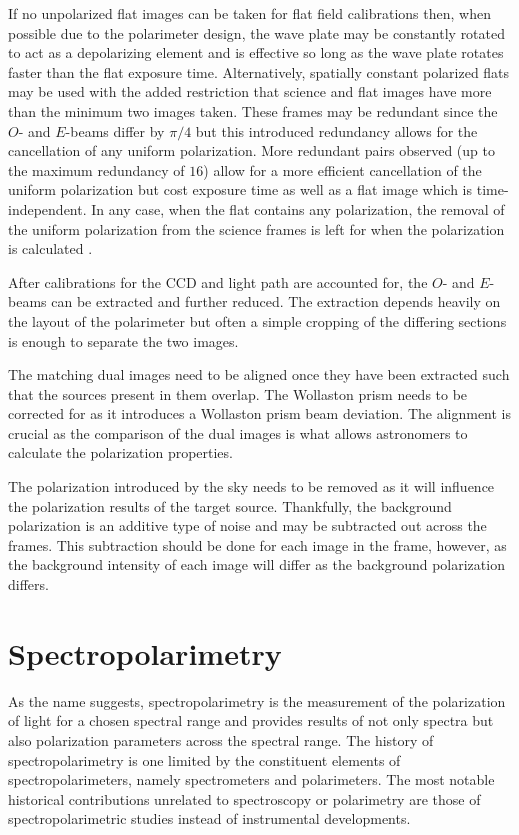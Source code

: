 If no unpolarized flat images can be taken for flat field calibrations then, when possible due to the polarimeter design, the wave plate may be constantly rotated to act as a depolarizing element and is effective so long as the wave plate rotates faster than the flat exposure time. Alternatively, spatially constant polarized flats may be used with the added restriction that science and flat images have more than the minimum two images taken. These frames may be redundant since the $O$- and $E$-beams differ by $\pi / 4$ but this introduced redundancy allows for the cancellation of any uniform polarization. More redundant pairs observed (up to the maximum redundancy of $16$) allow for a more efficient cancellation of the uniform polarization but cost exposure time as well as a flat image which is time-independent. In any case, when the flat contains any polarization, the removal of the uniform polarization  from the science frames is left for when the polarization is calculated \citep{polarimetry_error}.
\prgph

After calibrations for the \gls{CCD} and light path are accounted for, the $O$- and $E$-beams can be extracted and further reduced. The extraction depends heavily on the layout of the polarimeter but often a simple cropping of the differing sections is enough to separate the two images.
\prgph

The matching dual images need to be aligned once they have been extracted such that the sources present in them overlap. The Wollaston prism needs to be corrected for as it introduces a Wollaston prism beam deviation. The alignment is crucial as the comparison of the dual images is what allows astronomers to calculate the polarization properties.
\prgph

The polarization introduced by the sky needs to be removed as it will influence the polarization results of the target source. Thankfully, the background polarization is an additive type of noise and may be subtracted out across the frames. This subtraction should be done for each image in the frame, however, as the background intensity of each image will differ as the background polarization differs.


\section{Spectropolarimetry} %

As the name suggests, spectropolarimetry is the measurement of the polarization of light for a chosen spectral range and provides results of not only spectra but also polarization parameters across the spectral range. The history of spectropolarimetry is one limited by the constituent elements of spectropolarimeters, namely spectrometers and polarimeters. The most notable historical contributions unrelated to spectroscopy or polarimetry are those of spectropolarimetric studies instead of instrumental developments.
\prgph

